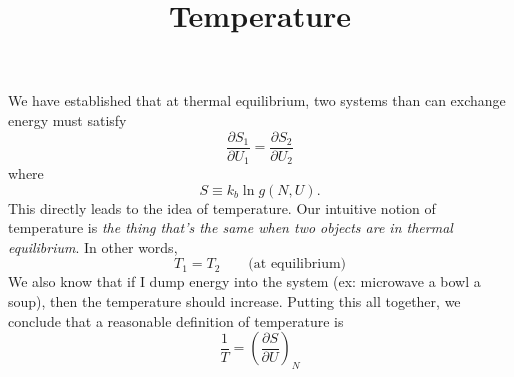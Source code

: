 \documentclass{article}
\title{Temperature}
\begin{document}
\maketitle

We have established that at thermal equilibrium, two systems than can exchange
energy must satisfy
\begin{equation}
  \frac{\partial S_1}{\partial U_1} = \frac{\partial S_2}{\partial U_2}
\end{equation}
where
\begin{equation}
  S \equiv k_b\ln g(N,U).
\end{equation}
This directly leads to the idea of temperature. Our intuitive notion of
temperature is \textit{the thing that's the same when two objects are in thermal
  equilibrium}. In other words,
\begin{equation}
  T_1 = T_2 \qquad \textrm{(at equilibrium)}
\end{equation}
We also know that if I dump energy into the system (ex: microwave a bowl a
soup), then the temperature should increase. Putting this all together, we
conclude that a reasonable definition of temperature is
\begin{equation}
  \frac{1}{T} = \left( \frac{\partial S}{\partial U}\right)_N
\end{equation}
\end{document}
